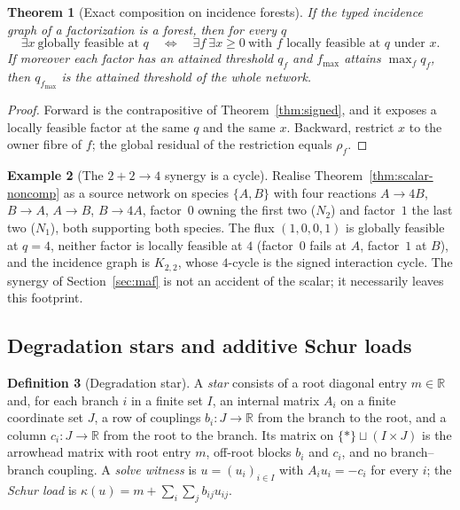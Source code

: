 \documentclass[11pt,a4paper]{article}
\theoremstyle{plain}
\newtheorem{theorem}{Theorem}[section]
\theoremstyle{definition}
\newtheorem{definition}[theorem]{Definition}
\newtheorem{example}[theorem]{Example}
\theoremstyle{remark}
\newcommand{\R}{\mathbb{R}}
\begin{document}
\begin{theorem}[Exact composition on incidence forests]\label{thm:forest}
If the typed incidence graph of a factorization is a forest, then for every $q$
\[
\exists x\ \text{globally feasible at }q\quad\iff\quad\exists f\ \exists x\ge 0\ \text{with } f \text{ locally feasible at } q \text{ under } x .
\]
If moreover each factor has an attained threshold $q_f$ and $f_{\max}$ attains $\max_f q_f$, then $q_{f_{\max}}$ is the attained threshold of the whole network.
\end{theorem}
\begin{proof}
Forward is the contrapositive of Theorem~\ref{thm:signed}, and it exposes a locally feasible factor at the same $q$ and the same $x$. Backward, restrict $x$ to the owner fibre of $f$; the global residual of the restriction equals $\rho_f$.
\end{proof}

\begin{example}[The $2+2\to 4$ synergy is a cycle]\label{ex:cycle}
Realise Theorem~\ref{thm:scalar-noncomp} as a source network on species $\{A,B\}$ with four reactions $A\to 4B$, $B\to A$, $A\to B$, $B\to 4A$, factor~$0$ owning the first two ($N_2$) and factor~$1$ the last two ($N_1$), both supporting both species. The flux $(1,0,0,1)$ is globally feasible at $q=4$, neither factor is locally feasible at $4$ (factor~$0$ fails at $A$, factor~$1$ at $B$), and the incidence graph is $K_{2,2}$, whose $4$-cycle is the signed interaction cycle. The synergy of Section~\ref{sec:maf} is not an accident of the scalar; it necessarily leaves this footprint.
\end{example}

\subsection{Degradation stars and additive Schur loads}

\begin{definition}[Degradation star]
A \emph{star} consists of a root diagonal entry $m\in\R$ and, for each branch $i$ in a finite set $I$, an internal matrix $A_i$ on a finite coordinate set $J$, a row of couplings $b_i:J\to\R$ from the branch to the root, and a column $c_i:J\to\R$ from the root to the branch. Its matrix on $\{\ast\}\sqcup(I\times J)$ is the arrowhead matrix with root entry $m$, off-root blocks $b_i$ and $c_i$, and no branch--branch coupling. A \emph{solve witness} is $u=(u_i)_{i\in I}$ with $A_iu_i=-c_i$ for every $i$; the \emph{Schur load} is $\kappa(u)=m+\sum_i\sum_j b_{ij}u_{ij}$.
\end{definition}
\end{document}
